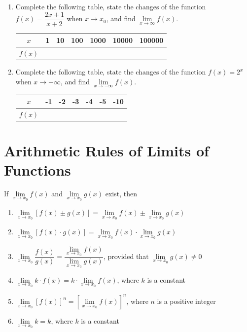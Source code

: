 \documentclass[12pt]{report}
\begin{document}
\begin{enumerate}
  \item Complete the following table, state the changes of the function $f (x) =
          \dfrac{2x + 1}{x + 2}$ when $x \to x_0$, and find $\lim\limits_{x \to \infty} f
          (x)$.
        \begin{center}
          \begin{tabular}{|c|c|c|c|c|c|c|}
            \hline
            $x$     & 1 & 10 & 100 & 1000 & 10000 & 100000 \\
            \hline
            $f (x)$ &   &    &     &      &       &        \\
            \hline
          \end{tabular}
        \end{center}

  \item Complete the following table, state the changes of the function $f (x) = 2^x$
        when $x \to -\infty$, and find $\lim\limits_{x \to -\infty} f (x)$.
        \begin{center}
          \begin{tabular}{|c|c|c|c|c|c|c|}
            \hline
            $x$     & -1 & -2 & -3 & -4 & -5 & -10 \\
            \hline
            $f (x)$ &    &    &    &    &    &     \\
            \hline
          \end{tabular}
        \end{center}
\end{enumerate}

\section{Arithmetic Rules of Limits of Functions}

If $\lim\limits_{x \to x_0} f (x)$ and $\lim\limits_{x \to x_0} g(x)$ exist,
then
\begin{enumerate}
  \item $\lim\limits_{x \to x_0} [f (x) \pm g(x)] = \lim\limits_{x \to x_0} f (x) \pm
          \lim\limits_{x \to x_0} g(x)$
  \item $\lim\limits_{x \to x_0} [f (x) \cdot g(x)] = \lim\limits_{x \to x_0} f (x) \cdot \lim\limits_{x \to x_0} g(x)$
  \item $\lim\limits_{x \to x_0} \dfrac{f (x)}{g(x)} = \dfrac{\lim\limits_{x \to x_0} f (x)}{\lim\limits_{x \to x_0} g(x)}$,
        provided that $\lim\limits_{x \to x_0} g(x) \neq 0$
  \item $\lim\limits_{x \to x_0} k \cdot f (x) = k \cdot \lim\limits_{x \to x_0} f (x)$, where $k$ is a constant
  \item $\lim\limits_{x \to x_0} [f (x)]^n = \left[\lim\limits_{x \to x_0} f (x)\right]^n$, where $n$ is a positive integer
  \item $\lim\limits_{x \to x_0} k = k$, where $k$ is a constant
\end{enumerate}
\end{document}
